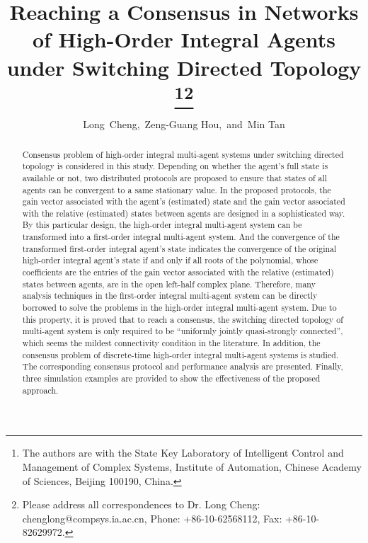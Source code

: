 \documentclass[12pt,draftcls,onecolumn]{IEEEtran}
\begin{document}
\title{Reaching a Consensus in Networks of High-Order Integral Agents under Switching Directed Topology
\thanks{The authors are with the State Key Laboratory of Intelligent Control and Management of Complex Systems, Institute of Automation, Chinese
Academy of Sciences, Beijing 100190, China.}\thanks{Please address all correspondences to Dr. Long Cheng: chenglong@compsys.ia.ac.cn, Phone: +86-10-62568112, Fax:
+86-10-82629972.}}

\author{Long~Cheng,~Zeng-Guang Hou,~and~Min Tan}

\maketitle

\vspace{0.5cm}


\begin{abstract}
Consensus problem of high-order integral multi-agent systems under switching directed topology is considered in this study. Depending on whether the agent's full state is available or not, two distributed protocols are proposed to ensure that states of all agents can be convergent to a same stationary value. In the proposed protocols, the gain vector associated with the agent's (estimated) state and the gain vector associated with the relative (estimated) states between agents are designed in a sophisticated way. By this particular design, the high-order integral multi-agent system can be transformed into a first-order integral multi-agent system. And the convergence of the transformed first-order integral agent's state indicates the convergence of the original high-order integral agent's state if and only if all roots of the polynomial, whose coefficients are the entries of the gain vector associated with the relative (estimated) states between agents, are in the open left-half complex plane. Therefore, many analysis techniques in the first-order integral multi-agent system can be directly borrowed to solve the problems in the high-order integral multi-agent system. Due to this property, it is proved that to reach a consensus, the switching directed topology of multi-agent system is only required to be ``uniformly jointly quasi-strongly connected'', which seems the mildest connectivity condition in the literature. In addition, the consensus problem of discrete-time high-order integral multi-agent systems is studied. The corresponding consensus protocol and performance analysis are presented. Finally, three simulation examples are provided to show the effectiveness of the proposed approach.
\end{abstract}
\end{document}
